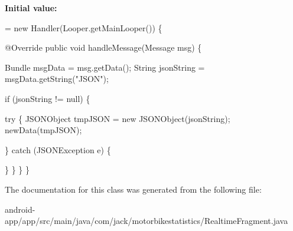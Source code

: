 {\bfseries Initial value\+:}
\begin{DoxyCode}
= \textcolor{keyword}{new} Handler(Looper.getMainLooper()) \{

        @Override
        \textcolor{keyword}{public} \textcolor{keywordtype}{void} handleMessage(Message msg) \{

            Bundle msgData = msg.getData();
            String jsonString = msgData.getString(\textcolor{stringliteral}{"JSON"});

            \textcolor{keywordflow}{if} (jsonString != null) \{

                
                \textcolor{keywordflow}{try} \{
                    JSONObject tmpJSON = \textcolor{keyword}{new} JSONObject(jsonString);
                    newData(tmpJSON);

                \} \textcolor{keywordflow}{catch} (JSONException e) \{
                    
                \}
            \}
        \}
    \}
\end{DoxyCode}


The documentation for this class was generated from the following file\+:\begin{DoxyCompactItemize}
\item 
android-\/app/app/src/main/java/com/jack/motorbikestatistics/Realtime\+Fragment.\+java\end{DoxyCompactItemize}
